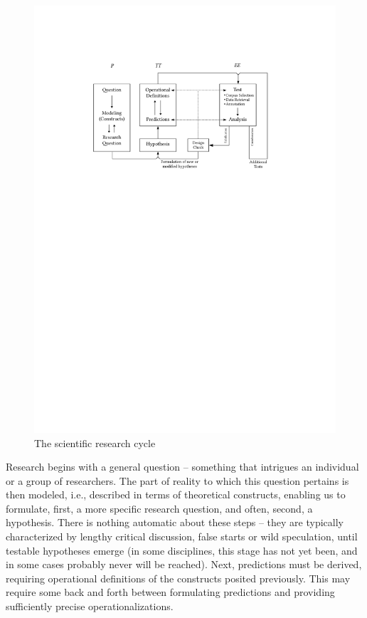 \begin{figure}
\caption{The scientific research cycle}
\label{fig:researchcycle}
\includegraphics[scale=0.9]{figures/researchcycle}
\end{figure}

Research begins with a general question -- something that intrigues an individual or a group of researchers. The part of reality to which this question pertains is then modeled, i.e., described in terms of theoretical constructs, enabling us to formulate, first, a more specific research question, and often, second, a hypothesis.  There is nothing automatic about these steps -- they are typically characterized by lengthy critical discussion, false starts or wild speculation, until testable hypotheses emerge (in some disciplines, this stage has not yet been, and in some cases probably never will be reached). Next, predictions must be derived, requiring operational  definitions of the constructs posited previously. This may require some back and forth between formulating predictions and providing sufficiently precise operationalizations.

